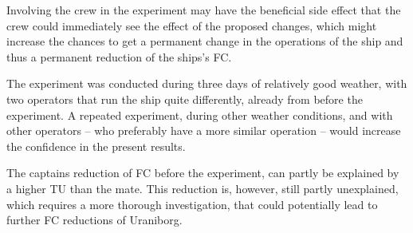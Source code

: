 Involving the crew in the experiment may have the beneficial side effect that the crew could immediately see the effect of the proposed changes, which might increase the chances to get a permanent change in the operations of the ship and thus a permanent reduction of the ships's FC.

The experiment was conducted during three days of relatively good weather, with two operators that run the ship quite differently, already from before the experiment.
A repeated experiment, during other weather conditions, and with other operators --   who preferably have a more similar operation -- would increase the confidence in the present results.

The captains reduction of FC before the experiment, can partly be explained by a higher TU  than the mate. %
This reduction is, however, still partly unexplained, which requires a more thorough investigation, that could potentially lead to further FC reductions of Uraniborg. 
